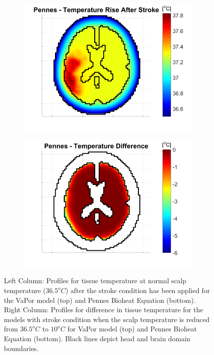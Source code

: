 \documentclass[11pt,english,a4paper,twoside,openright]{report}
\begin{document}
{{{{{{{\begin{figure}[h]
\begin{subfigure}[b]{0.49\textwidth}
		\includegraphics[width=\textwidth]{Chapter5/Chapter5_StrokeTemp1}
	\end{subfigure}
	\begin{subfigure}[b]{0.49\textwidth}
		\includegraphics[width=\textwidth]{Chapter5/Chapter5_StrokeTemp3}
	\end{subfigure}
	\caption[Temperature profiles for head after simulated stroke with scalp temperature of $36.5^{o}C$ and temperature difference profiles for head after simulated stroke and after reducing scalp tempreature to $10^{o}C$]{Left Column: Profiles for tissue temperature at normal scalp temperature ($36.5^{o}C$) after the stroke condition has been applied for the VaPor model (top) and Pennes Bioheat Equation (bottom). Right Column: Profiles for difference in tissue temperature for the models with stroke condition when the scalp temperature is reduced from $36.5^{o}C$ to $10^{o}C$ for VaPor model (top) and Pennes Bioheat Equation (bottom). Black lines depict head and brain domain boundaries.}
	\label{fig:StrokeTemperature}
\end{figure}

}}}}}}}
\end{document}
